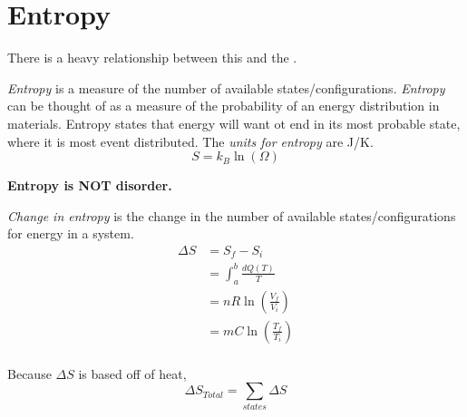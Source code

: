 \section{Entropy} \label{sec:Entropy}
There is a heavy relationship between this and the .
	\begin{definition}[Entropy] \label{def:Entropy}
		\emph{Entropy} is a measure of the number of available states/configurations.
		\emph{Entropy} can be thought of as a measure of the probability of an energy distribution in materials.
		Entropy states that energy will want ot end in its most probable state, where it is most event distributed.
		The \emph{units for entropy} are \si{\joule / \kelvin}.
		\begin{equation} \label{eq:Entropy}
			S = k_{B} \ln \left( \Omega \right)
		\end{equation}
		\begin{note}
			\textbf{Entropy is NOT disorder.}
		\end{note}
	\end{definition}
	\begin{definition} \label{def:Change in Entropy}
		\emph{Change in entropy} is the change in the number of available states/configurations for energy in a system.
		\begin{equation} \label{eq:Change in Entropy}
			\begin{aligned}
				\Delta S &= S_{f} - S_{i} \\
						 &= \int_{a}^{b} \frac{dQ \left( T \right)}{T} \\
						 &= nR \ln \left( \frac{V_{f}}{V_{i}} \right) \\
						 &= mC \ln \left( \frac{T_{f}}{T_{i}} \right) \\
			\end{aligned}
		\end{equation}
		\begin{note}
			Because $\Delta S$ is based off of heat,
			\begin{equation}
				\Delta S_{Total} = \sum_{states} \Delta S
			\end{equation}
		\end{note}
	\end{definition}

